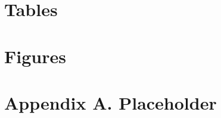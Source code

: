 \documentclass[12pt,notitlepage]{article}
\begin{document}
\section*{Tables} \label{sec:tab}



\clearpage

\section*{Figures} \label{sec:fig}





\clearpage

\section*{Appendix A. Placeholder} \label{sec:appendixa}
\end{document}
